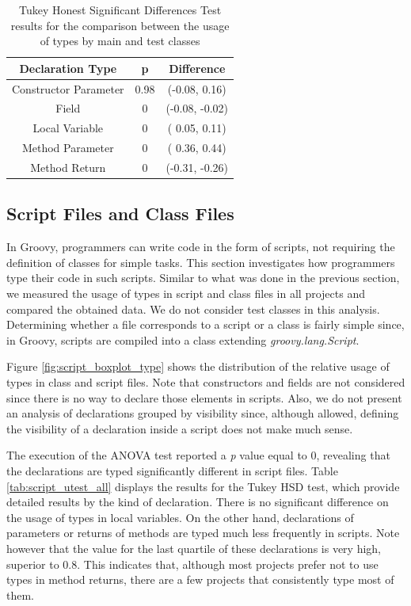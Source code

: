 \documentclass[]{sigplanconf}
\begin{document}
\begin{table}[h!]
\centering{}%
\small
\begin{tabular}{|c|c|c|}
\hline 
Declaration Type 		& p & Difference \\
\hline 
\hline 
Constructor Parameter &  0.98     & (-0.08,  0.16) \\ \hline
Field &  0          & (-0.08, -0.02)  \\ \hline
Local Variable &  0          & ( 0.05,  0.11) \\ \hline
Method Parameter &  0          & ( 0.36,  0.44) \\ \hline
Method Return &  0          & (-0.31, -0.26) \\ \hline
\end{tabular}
\caption{Tukey Honest Significant Differences Test results for the comparison between the usage of types by main and test classes}
\label{tab:test_utest_type}
\end{table}

\subsection{Script Files and Class Files\label{sec:results-scripts}}
In Groovy, programmers can write code in the form of scripts, not requiring the definition of classes for simple tasks.
This section investigates how programmers type their code in such scripts.
Similar to what was done in the previous section, we measured the usage of types in script and class files in all projects and compared the obtained data.
We do not consider test classes in this analysis.
Determining whether a file corresponds to a script or a class is fairly simple since, in Groovy, scripts are compiled into a class extending \emph{groovy.lang.Script}.

Figure \ref{fig:script_boxplot_type} shows the distribution of the relative usage of types in class and script files.
Note that constructors and fields are not considered since there is no way to declare those elements in scripts.
Also, we do not present an analysis of declarations grouped by visibility since, although allowed, defining the visibility of a declaration inside a script does not make much sense.


The execution of the ANOVA test reported a \emph{p} value equal to 0, revealing that the declarations are typed significantly different in script files.
Table \ref{tab:script_utest_all} displays the results for the Tukey HSD test, which provide detailed results by the kind of declaration.
There is no significant difference on the usage of types in local variables.
On the other hand, declarations of parameters or returns of methods are typed much less frequently in scripts.
Note however that the value for the last quartile of these declarations is very high, superior to 0.8.
This indicates that, although most projects prefer not to use types in method returns, there are a few projects that consistently type most of them.
\end{document}
